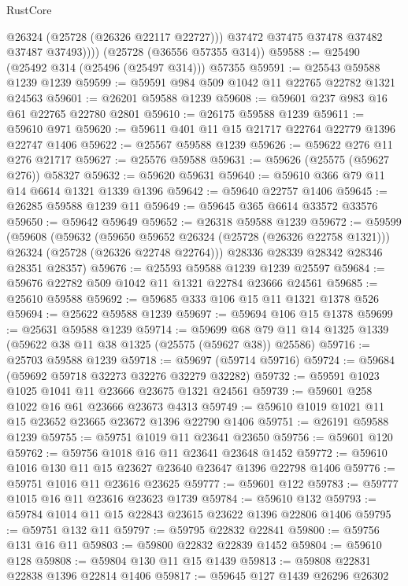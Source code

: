 \begin{lexlean}{RustCore}
\begin{coremodule}
              @26324
              (@25728 (@26326 @22117 @22727)))
            @37472
            @37475
            @37478
            @37482
            @37487
            @37493))))
    (@25728 (@36556 @57355 @314))
@59588 := @25490 (@25492 @314 (@25496 (@25497 @314))) @57355
@59591 := @25543 @59588 @1239 @1239
@59599 := @59591 @984 @509 @1042 @11 @22765 @22782 @1321 @24563
@59601 := @26201 @59588 @1239
@59608 := @59601 @237 @983 @16 @61 @22765 @22780 @2801
@59610 := @26175 @59588 @1239
@59611 := @59610 @971
@59620 := @59611 @401 @11 @15 @21717 @22764 @22779 @1396 @22747 @1406
@59622 := @25567 @59588 @1239
@59626 := @59622 @276 @11 @276 @21717
@59627 := @25576 @59588
@59631 := @59626 (@25575 (@59627 @276)) @58327
@59632 := @59620 @59631
@59640 := @59610 @366 @79 @11 @14 @6614 @1321 @1339 @1396
@59642 := @59640 @22757 @1406
@59645 := @26285 @59588 @1239 @11
@59649 := @59645 @365 @6614 @33572 @33576
@59650 := @59642 @59649
@59652 := @26318 @59588 @1239
@59672 := @59599
    (@59608
      (@59632
        (@59650 @59652 @26324 (@25728 (@26326 @22758 @1321)))
        @26324
        (@25728 (@26326 @22748 @22764)))
      @28336
      @28339
      @28342
      @28346
      @28351
      @28357)
@59676 := @25593 @59588 @1239 @1239 @25597
@59684 := @59676 @22782 @509 @1042 @11 @1321 @22784 @23666 @24561
@59685 := @25610 @59588
@59692 := @59685 @333 @106 @15 @11 @1321 @1378 @526
@59694 := @25622 @59588 @1239
@59697 := @59694 @106 @15 @1378
@59699 := @25631 @59588 @1239
@59714 := @59699 @68 @79 @11 @14 @1325 @1339 (@59622 @38 @11 @38 @1325 (@25575 (@59627 @38)) @25586)
@59716 := @25703 @59588 @1239
@59718 := @59697 (@59714 @59716)
@59724 := @59684 (@59692 @59718 @32273 @32276 @32279 @32282)
@59732 := @59591 @1023 @1025 @1041 @11 @23666 @23675 @1321 @24561
@59739 := @59601 @258 @1022 @16 @61 @23666 @23673 @4313
@59749 := @59610 @1019 @1021 @11 @15 @23652 @23665 @23672 @1396 @22790 @1406
@59751 := @26191 @59588 @1239
@59755 := @59751 @1019 @11 @23641 @23650
@59756 := @59601 @120
@59762 := @59756 @1018 @16 @11 @23641 @23648 @1452
@59772 := @59610 @1016 @130 @11 @15 @23627 @23640 @23647 @1396 @22798 @1406
@59776 := @59751 @1016 @11 @23616 @23625
@59777 := @59601 @122
@59783 := @59777 @1015 @16 @11 @23616 @23623 @1739
@59784 := @59610 @132
@59793 := @59784 @1014 @11 @15 @22843 @23615 @23622 @1396 @22806 @1406
@59795 := @59751 @132 @11
@59797 := @59795 @22832 @22841
@59800 := @59756 @131 @16 @11
@59803 := @59800 @22832 @22839 @1452
@59804 := @59610 @128
@59808 := @59804 @130 @11 @15 @1439
@59813 := @59808 @22831 @22838 @1396 @22814 @1406
@59817 := @59645 @127 @1439 @26296 @26302

\end{coremodule}
\end{lexlean}
